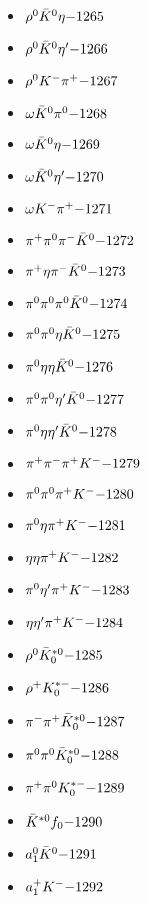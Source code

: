 \begin{multicols}{3}
\begin{itemize}
 \item $ \rho^{0} \bar{K}^{0} \eta \hfill{-1265}$
 \item $ \rho^{0} \bar{K}^{0} {\eta^{\prime}} \hfill{-1266}$
 \item $ \rho^{0} K^{-} \pi^{+} \hfill{-1267}$
 \item $ \omega \bar{K}^{0} \pi^{0} \hfill{-1268}$
 \item $ \omega \bar{K}^{0} \eta \hfill{-1269}$
 \item $ \omega \bar{K}^{0} {\eta^{\prime}} \hfill{-1270}$
 \item $ \omega K^{-} \pi^{+} \hfill{-1271}$
 \item $ \pi^{+} \pi^{0} \pi^{-} \bar{K}^{0} \hfill{-1272}$
 \item $ \pi^{+} \eta \pi^{-} \bar{K}^{0} \hfill{-1273}$
 \item $ \pi^{0} \pi^{0} \pi^{0} \bar{K}^{0} \hfill{-1274}$
 \item $ \pi^{0} \pi^{0} \eta \bar{K}^{0} \hfill{-1275}$
 \item $ \pi^{0} \eta \eta \bar{K}^{0} \hfill{-1276}$
 \item $ \pi^{0} \pi^{0} {\eta^{\prime}} \bar{K}^{0} \hfill{-1277}$
 \item $ \pi^{0} \eta {\eta^{\prime}} \bar{K}^{0} \hfill{-1278}$
 \item $ \pi^{+} \pi^{-} \pi^{+} K^{-} \hfill{-1279}$
 \item $ \pi^{0} \pi^{0} \pi^{+} K^{-} \hfill{-1280}$
 \item $ \pi^{0} \eta \pi^{+} K^{-} \hfill{-1281}$
 \item $ \eta \eta \pi^{+} K^{-} \hfill{-1282}$
 \item $ \pi^{0} {\eta^{\prime}} \pi^{+} K^{-} \hfill{-1283}$
 \item $ \eta {\eta^{\prime}} \pi^{+} K^{-} \hfill{-1284}$
 \item $ \rho^{0} \bar{K}_{0}^{*0} \hfill{-1285}$
 \item $ \rho^{+} K_{0}^{*-} \hfill{-1286}$
 \item $ \pi^{-} \pi^{+} \bar{K}_{0}^{*0} \hfill{-1287}$
 \item $ \pi^{0} \pi^{0} \bar{K}_{0}^{*0} \hfill{-1288}$
 \item $ \pi^{+} \pi^{0} K_{0}^{*-} \hfill{-1289}$
 \item $ \bar{K}^{*0} f_{0} \hfill{-1290}$
 \item $ a_{1}^{0} \bar{K}^{0} \hfill{-1291}$
 \item $ a_{1}^{+} K^{-} \hfill{-1292}$

\end{itemize}
\end{multicols}
